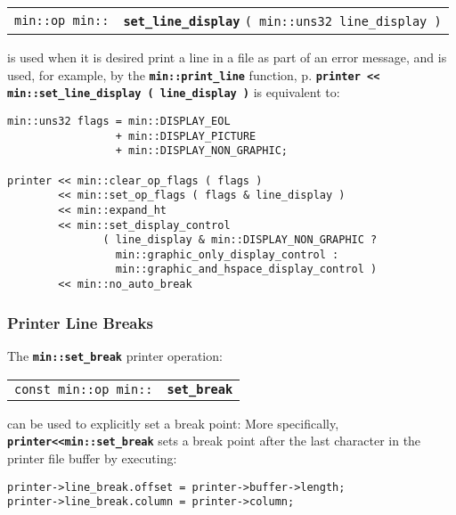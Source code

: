 \documentclass[12pt]{article}
\makeatletter
\newcommand{\TT}[1]{{\tt \bfseries #1}}
\newcommand{\ttindex}[1]{\index{#1@{\tt #1}}}
\newcommand{\pagref}[1]{p\pageref{#1}}
\newcommand{\EOL}{\penalty \exhyphenpenalty}
\newenvironment{indpar}[1][0.3in]%
	{\begin{list}{}%
		     {\setlength{\itemsep}{0in}%
		      \setlength{\topsep}{0in}%
		      \setlength{\parsep}{1ex}%
		      \setlength{\labelwidth}{#1}%
		      \setlength{\leftmargin}{#1}%
		      \addtolength{\leftmargin}{\labelsep}}%
	 \item}%
	{\end{list}}
\newcommand{\LABEL}[1]{\label{#1}}
\newcommand{\MINKEY}[1]%
	   {\TT{#1}\ttindex{min::#1}\ttindex{#1}}
\makeatother
\begin{document}
\begin{indpar}[1em]\begin{tabular}{r@{}l}
\verb|min::op min::|
    & \MINKEY{set\_line\_display} \verb|( min::uns32 line_display )|
\LABEL{MIN::SET_LINE_DISPLAY} \\
\end{tabular}\end{indpar}

is used when it is desired print a line in a file as part of an
error message, and is used, for example, by the
\TT{min::\EOL print\_\EOL line} function, \pagref{MIN::PRINT_LINE}.
\TT{printer <{}< min::\EOL set\_\EOL line\_\EOL display ( line\_\EOL display )}
is equivalent to:

\begin{indpar}\begin{verbatim}
min::uns32 flags = min::DISPLAY_EOL
                 + min::DISPLAY_PICTURE
                 + min::DISPLAY_NON_GRAPHIC;

printer << min::clear_op_flags ( flags )
        << min::set_op_flags ( flags & line_display )
        << min::expand_ht
        << min::set_display_control
               ( line_display & min::DISPLAY_NON_GRAPHIC ?
                 min::graphic_only_display_control :
                 min::graphic_and_hspace_display_control )
        << min::no_auto_break
\end{verbatim}\end{indpar}

\subsubsection{Printer Line Breaks}
\label{PRINTER-LINE-BREAKS}

The \TT{min::set\_\EOL break} printer operation:

\begin{indpar}[1em]\begin{tabular}{r@{}l}
\verb|const min::op min::| & \MINKEY{set\_\EOL break}
\LABEL{MIN::SET_BREAK} \\
\end{tabular}\end{indpar}

can be used to explicitly set a break point:
More specifically, \TT{printer<{}<min::set\_\EOL break} sets a break point after
the last character in the printer file buffer by executing:
\begin{indpar}\begin{verbatim}
printer->line_break.offset = printer->buffer->length;
printer->line_break.column = printer->column;
\end{verbatim}\end{indpar}
\end{document}
